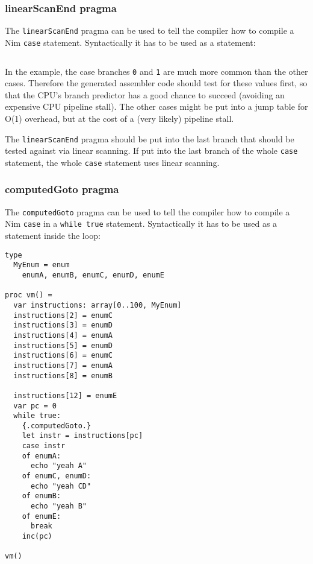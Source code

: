 \hypertarget{linearscanend-pragma}{%
\subsubsection{linearScanEnd pragma}\label{linearscanend-pragma}}

The \texttt{linearScanEnd} pragma can be used to tell the compiler how
to compile a Nim \texttt{case} statement. Syntactically it has to be
used as a statement:

\begin{verbatim}
\end{verbatim}

In the example, the case branches \texttt{0} and \texttt{1} are much
more common than the other cases. Therefore the generated assembler code
should test for these values first, so that the CPU's branch predictor
has a good chance to succeed (avoiding an expensive CPU pipeline stall).
The other cases might be put into a jump table for O(1) overhead, but at
the cost of a (very likely) pipeline stall.

The \texttt{linearScanEnd} pragma should be put into the last branch
that should be tested against via linear scanning. If put into the last
branch of the whole \texttt{case} statement, the whole \texttt{case}
statement uses linear scanning.

\hypertarget{computedgoto-pragma}{%
\subsubsection{computedGoto pragma}\label{computedgoto-pragma}}

The \texttt{computedGoto} pragma can be used to tell the compiler how to
compile a Nim \texttt{case} in a \texttt{while\ true} statement.
Syntactically it has to be used as a statement inside the loop:

\begin{verbatim}
type
  MyEnum = enum
    enumA, enumB, enumC, enumD, enumE

proc vm() =
  var instructions: array[0..100, MyEnum]
  instructions[2] = enumC
  instructions[3] = enumD
  instructions[4] = enumA
  instructions[5] = enumD
  instructions[6] = enumC
  instructions[7] = enumA
  instructions[8] = enumB

  instructions[12] = enumE
  var pc = 0
  while true:
    {.computedGoto.}
    let instr = instructions[pc]
    case instr
    of enumA:
      echo "yeah A"
    of enumC, enumD:
      echo "yeah CD"
    of enumB:
      echo "yeah B"
    of enumE:
      break
    inc(pc)

vm()
\end{verbatim}

